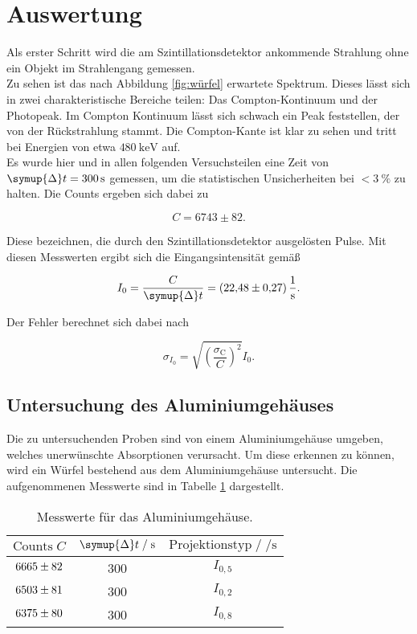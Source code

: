 \section{Auswertung}
\label{sec:Auswertung}

Als erster Schritt wird die am Szintillationsdetektor ankommende Strahlung ohne ein Objekt im Strahlengang gemessen. \\
Zu sehen ist das nach Abbildung \ref{fig:würfel} erwartete Spektrum. Dieses lässt sich in zwei charakteristische Bereiche teilen: Das 
Compton-Kontinuum und der Photopeak. Im Compton Kontinuum lässt sich schwach ein Peak feststellen, der von der Rückstrahlung 
stammt. Die Compton-Kante ist klar zu sehen und tritt bei Energien von etwa $\SI{480}{\kilo\electronvolt}$ auf.\\
Es wurde hier und in allen folgenden Versuchsteilen eine Zeit von $\symup{\Delta}t = \SI{300}{\second}$ gemessen, um die 
statistischen Unsicherheiten bei $< \SI{3}{\percent}$ zu halten. Die Counts 
ergeben sich dabei zu

\begin{equation*}
  C = 6743 \pm 82.
\end{equation*}

Diese bezeichnen, die durch den Szintillationsdetektor ausgelösten Pulse. 
Mit diesen Messwerten ergibt sich die Eingangsintensität gemäß 

\begin{equation}
  I_0 = \frac{C}{\symup{\Delta}t} = \SI{22.48+-0.27}{\per\second}.
  \label{eqn:Int}
\end{equation}

Der Fehler berechnet sich dabei nach

\begin{equation*}
  \sigma_{I_0} = \sqrt{\left(\frac{\sigma_\text{C}}{C}\right)^2}I_0.
\end{equation*}

\subsection{Untersuchung des Aluminiumgehäuses}

Die zu untersuchenden Proben sind von einem Aluminiumgehäuse umgeben, welches unerwünschte Absorptionen verursacht. Um diese
erkennen zu können, wird ein Würfel bestehend aus dem Aluminiumgehäuse untersucht. Die aufgenommenen Messwerte sind in 
Tabelle \ref{tab:mess1} dargestellt. 

\begin{table}[H]
  \centering
  \caption{Messwerte für das Aluminiumgehäuse.}
  \label{tab:mess1}
  \begin{tabular}{c c c}
  \toprule
  $\text{Counts} \; C$ & $\symup{\Delta} t \;/\; \si{\second}$ & $\text{Projektionstyp} \;/\; \si{\per\second}$ \\
  \midrule
      $\num{6665+-82}$ & 300 & $I_{0,5}$\\
      $\num{6503+-81}$ & 300 & $I_{0,2}$\\
      $\num{6375+-80}$ & 300 & $I_{0,8}$\\
  \bottomrule
  \end{tabular}
\end{table}


